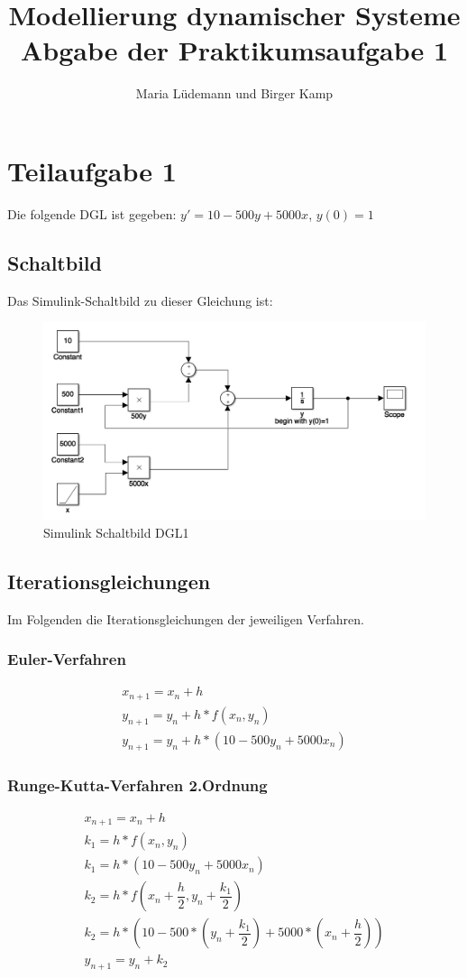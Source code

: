 \documentclass[]{scrartcl}
\title{Modellierung dynamischer Systeme  \\ Abgabe der Praktikumsaufgabe 1}
\author{Maria Lüdemann und Birger Kamp}
\begin{document}
\maketitle

\begin{abstract}

\end{abstract}

\section{Teilaufgabe 1}
Die folgende DGL ist gegeben:
$ y' = 10 - 500y + 5000x $,
$ y(0) = 1 $

\subsection*{Schaltbild}
Das Simulink-Schaltbild zu dieser Gleichung ist:

\begin{figure}[htbp]
\centering
\includegraphics[width=0.7\linewidth]{a1_1_Schaltbild}
\caption{Simulink Schaltbild DGL1}
\label{fig:A1_1_Schaltbild}
\end{figure}

\subsection{Iterationsgleichungen}
Im Folgenden die Iterationsgleichungen der jeweiligen Verfahren.

\subsubsection{Euler-Verfahren}
\begin{align}
x_{n+1} = x_{n}+h \\
y_{n+1} = y_{n}+h*f(x_{n},y_{n}) \\
y_{n+1} = y_{n}+h*(10-500y_{n}+5000x_{n})
\end{align}

\subsubsection{Runge-Kutta-Verfahren 2.Ordnung}
\begin{align}
x_{n+1} = x_{n}+h \\
k_{1} = h*f(x_{n},y_{n}) \\
k_{1} = h*(10-500y_{n}+5000x_{n}) \\
k_{2} = h*f(x_{n} + \dfrac{h}{2},y_{n} + \dfrac{k_{1}}{2}) \\
k_{2} = h*(10-500*(y_{n} + \dfrac{k_{1}}{2})+5000*(x_{n} + \dfrac{h}{2})) \\
y_{n+1} = y_{n}+k_{2}
\end{align}
\end{document}
